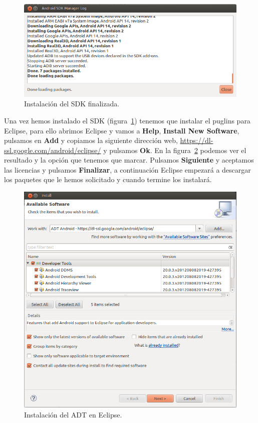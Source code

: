 \begin{figure}
  \centering
    \includegraphics[scale=0.6]{./ConfiguracionEclipse/imagenes/SDKfinalizado.png}
  \caption{Instalación del SDK finalizada.}
  \label{fig:SDKfinalizado}
\end{figure}

Una vez hemos instalado el SDK (figura~\ref{fig:SDKfinalizado}) tenemos que instalar el puglins para Eclipse, para ello abrimos Eclipse y vamos a \textbf{Help}, \textbf{Install New Software}, pulsamos en \textbf{Add} y copiamos la siguiente dirección web, \url{https://dl-ssl.google.com/android/eclipse/} y pulsamos \textbf{Ok}. En la figura~\ref{fig:instalacionADT} podemos ver el resultado y la opción que tenemos que marcar. Pulsamos \textbf{Siguiente} y aceptamos las licencias y pulsamos \textbf{Finalizar}, a continuación Eclipse empezará a descargar los paquetes que le hemos solicitado y cuando termine los instalará.

\begin{figure}
  \centering
    \includegraphics[scale=0.6]{./ConfiguracionEclipse/imagenes/instalacionADT.png}
  \caption{Instalación del ADT en Eclipse.}
  \label{fig:instalacionADT}
\end{figure}

